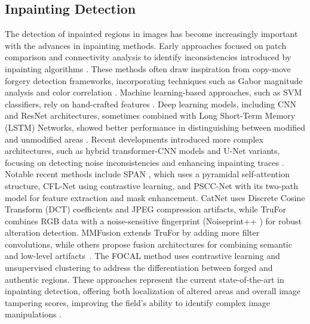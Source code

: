 
\subsection{Inpainting Detection}

The detection of inpainted regions in images has become increasingly important with the advances in inpainting methods. Early approaches focused on patch comparison and connectivity analysis to identify inconsistencies introduced by inpainting algorithms \cite{wu2008detection, chang2013forgerydetection, liang2015efficientforgerydetection, zhang2018robustforgery}. These methods often draw inspiration from copy-move forgery detection frameworks, incorporating techniques such as Gabor magnitude analysis and color correlation \cite{christlein2012evaluationcopymove, lee2015copymovegabor, jin2018sparcitybased, mahfoudi2020forgerydetectionreflection}. Machine learning-based approaches, such as SVM classifiers, rely on hand-crafted features \cite{shen2017svm}. Deep learning models, including CNN and ResNet \cite{he2015deep} architectures, sometimes combined with Long Short-Term Memory (LSTM) Networks, showed better performance in distinguishing between modified and unmodified areas \cite{zhu2018deeplearningapproachpatchbasedcnn, li2019highpasssfullyconvulutionalresnetcnn, lu2020detectionlstmcnn, kumar2021semanticsegmentioninpainting, simonyan2015deepconvolutionalnetworkslargescalevgg}. Recent developments introduced more complex architectures, such as hybrid transformer-CNN models and U-Net \cite{ronneberger2015unet} variants, focusing on detecting noise inconsistencies and enhancing inpainting traces \cite{zhu2023transformercnn, zhang2023localizationinpaintingfeatureenhancemnet, ronneberger2015unet, wu2022iid}. Notable recent methods include SPAN \cite{hu2020span}, which uses a pyramidal self-attention structure, CFL-Net \cite{niloy2022cflnetimageforgerylocalization} using contrastive learning, and PSCC-Net \cite{luy2022pscc} with its two-path model for feature extraction and mask enhancement. CatNet \cite{kwon2022catnet} uses Discrete Cosine Transform (DCT) coefficients and JPEG compression artifacts, while TruFor \cite{guillaro2023trufor} combines RGB data with a noise-sensitive fingerprint (Noiseprint++ \cite{cozzoline2020noiseprint}) for robust alteration detection. MMFusion \cite{triaridis2023mmfusion} extends TruFor by adding more filter convolutions, while others propose fusion architectures for combining semantic and low-level artifacts~\cite{karageorgiou2024fusion}. The FOCAL method \cite{wu2023rethinkingimageforgerydetectionfocal} uses contrastive learning and unsupervised clustering to address the differentiation between forged and authentic regions. These approaches represent the current state-of-the-art in inpainting detection, offering both localization of altered areas and overall image tampering scores, improving the field's ability to identify complex image manipulations \cite{criminisi2004patch, bayar2016bayarfilter, fridrich2012srm}. 

